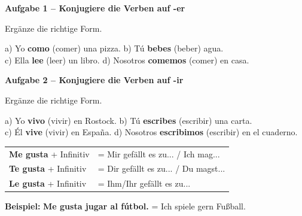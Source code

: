 \documentclass[11pt, a4paper]{article}
\newcommand{\fachfarbe}{spanisch}
\newcommand{\punktebox}[1]{\hfill\fbox{\small \_/#1}}
\newcommand{\lsg}[1]{\textcolor{loesung}{\textbf{#1}}}
\newenvironment{aufgabe}[1]{%
    \needspace{5\baselineskip}%
    \nopagebreak[4]%
    \vspace{10pt}
    \noindent\textbf{\textcolor{\fachfarbe}{Aufgabe #1}}
    \nopagebreak[4]%
    \vspace{5pt}
    \nopagebreak[4]%
    \begin{list}{}{\leftmargin=0pt}
    \item[]
}{%
    \end{list}
}
\newcommand{\es}[1]{\textcolor{\fachfarbe}{\textbf{#1}}}
\begin{document}
\vspace{10pt}


\begin{aufgabe}{1 -- Konjugiere die Verben auf -er}
Ergänze die richtige Form. \punktebox{4}
\end{aufgabe}

\noindent
a) Yo \lsg{como} (comer) una pizza. \hfill
b) Tú \lsg{bebes} (beber) agua. \\[0.8em]
c) Ella \lsg{lee} (leer) un libro. \hfill
d) Nosotros \lsg{comemos} (comer) en casa. \\

\vspace{10pt}


\begin{aufgabe}{2 -- Konjugiere die Verben auf -ir}
Ergänze die richtige Form. \punktebox{4}
\end{aufgabe}

\noindent
a) Yo \lsg{vivo} (vivir) en Rostock. \hfill
b) Tú \lsg{escribes} (escribir) una carta. \\[0.8em]
c) Él \lsg{vive} (vivir) en España. \hfill
d) Nosotros \lsg{escribimos} (escribir) en el cuaderno. \\

\vspace{10pt}


\begin{merkkasten}

\begin{tabular}{ll}
\es{Me gusta} + Infinitiv & = Mir gefällt es zu... / Ich mag... \\
\es{Te gusta} + Infinitiv & = Dir gefällt es zu... / Du magst... \\
\es{Le gusta} + Infinitiv & = Ihm/Ihr gefällt es zu... \\
\end{tabular}

\vspace{0.5em}
\textbf{Beispiel:} \es{Me gusta jugar al fútbol.} = Ich spiele gern Fußball.

\end{merkkasten}
\end{document}
